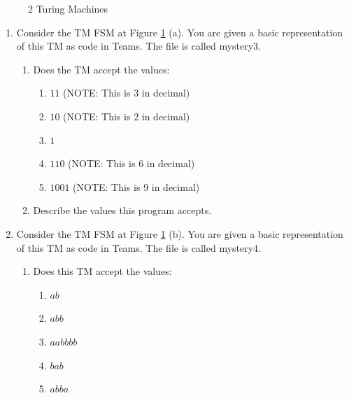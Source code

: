 \begin{appendices}
\begin{figure}[htb]
\begin{subfigure}{0.8\textwidth}
        \caption{}
    \end{subfigure}
    \caption{2 Turing Machines}
    \label{fig:TM_questions}
\end{figure}
\begin{enumerate}
    \item Consider the TM FSM at Figure \ref{fig:TM_questions} (a). You are given a basic representation of this TM as code in Teams. The file is called mystery3.
    \begin{enumerate}
        \item Does the TM accept the values:
        \begin{enumerate}
            \item $11$ (NOTE: This is $3$ in decimal)
            \item $10$ (NOTE: This is $2$ in decimal)
            \item $1$
            \item $110$ (NOTE: This is $6$ in decimal)
            \item $1001$ (NOTE: This is $9$ in decimal)
        \end{enumerate}
        
        \item Describe the values this program accepts.
    \end{enumerate} 
    
    \item Consider the TM FSM at Figure \ref{fig:TM_questions} (b). You are given a basic representation of this TM as code in Teams. The file is called mystery4.
    \begin{enumerate}
        \item Does this TM accept the values:
        \begin{enumerate}
            \item $ab$
            \item $abb$
            \item $aabbbb$            
            \item $bab$
            \item $abba$
        \end{enumerate}


\end{enumerate}
\end{enumerate}
\end{appendices}
